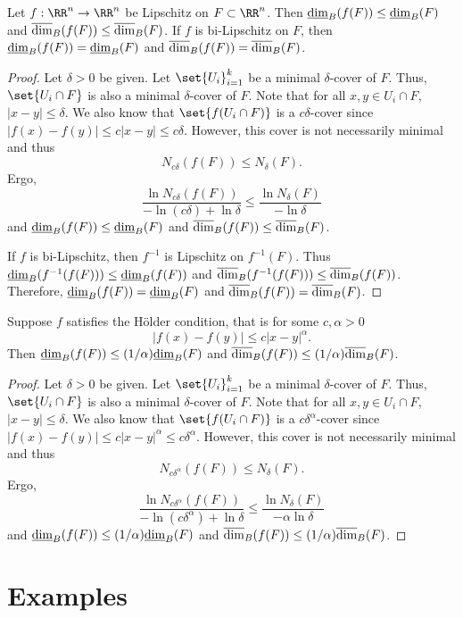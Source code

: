\begin{thm}
	Let $f:\RR^n\rightarrow\RR^n$ be Lipschitz on $F\subset\RR^n$.
	Then $\underline{\operatorname{dim}}_B(f(F))\leq\underline{\operatorname{dim}}_B(F)$ and $\overline{\operatorname{dim}}_B(f(F))\leq\overline{\operatorname{dim}}_B(F)$.
	If $f$ is bi-Lipschitz on $F$, then $\underline{\operatorname{dim}}_B(f(F))=\underline{\operatorname{dim}}_B(F)$ and $\overline{\operatorname{dim}}_B(f(F))=\overline{\operatorname{dim}}_B(F)$.
\end{thm}
\begin{proof}
	Let $\delta > 0$ be given.
	Let $\set{U_i}_{i=1}^k$ be a minimal $\delta$-cover of $F$.
	Thus, $\set{U_i\cap F}$ is also a minimal $\delta$-cover of $F$.
	Note that for all $x,y\in U_i\cap F$, $|x-y|\leq \delta$.
	We also know that $\set{f(U_i\cap F)}$ is a $c\delta$-cover since $|f(x)-f(y)|\leq c|x-y|\leq c\delta$.
	However, this cover is not necessarily minimal and thus
	\[
		N_{c\delta}(f(F))\leq N_\delta(F).
	\]
	Ergo,
	\[
		\frac{\ln N_{c\delta}(f(F))}{-\ln(c\delta)+\ln\delta}\leq\frac{\ln N_\delta(F)}{-\ln\delta}
	\]
	and $\underline{\operatorname{dim}}_B(f(F))\leq\underline{\operatorname{dim}}_B(F)$ and $\overline{\operatorname{dim}}_B(f(F))\leq\overline{\operatorname{dim}}_B(F)$.

	If $f$ is bi-Lipschitz, then $f^{-1}$ is Lipschitz on $f^{-1}(F)$.
	Thus $\underline{\operatorname{dim}}_B(f^{-1}(f(F)))\leq\underline{\operatorname{dim}}_B(f(F))$ and $\overline{\operatorname{dim}}_B(f^{-1}(f(F)))\leq\overline{\operatorname{dim}}_B(f(F))$.
	Therefore, $\underline{\operatorname{dim}}_B(f(F))=\underline{\operatorname{dim}}_B(F)$ and $\overline{\operatorname{dim}}_B(f(F))=\overline{\operatorname{dim}}_B(F)$.
\end{proof}

\begin{thm}
	Suppose $f$ satisfies the H\"{o}lder condition, that is for some $c,\alpha>0$
	\[
		|f(x)-f(y)|\leq c|x-y|^\alpha.
	\]
	Then $\underline{\operatorname{dim}}_B(f(F))\leq(1/\alpha)\underline{\operatorname{dim}}_B(F)$ and $\overline{\operatorname{dim}}_B(f(F))\leq(1/\alpha)\overline{\operatorname{dim}}_B(F)$.
\end{thm}
\begin{proof}
	Let $\delta > 0$ be given.
	Let $\set{U_i}_{i=1}^k$ be a minimal $\delta$-cover of $F$.
	Thus, $\set{U_i\cap F}$ is also a minimal $\delta$-cover of $F$.
	Note that for all $x,y\in U_i\cap F$, $|x-y|\leq \delta$.
	We also know that $\set{f(U_i\cap F)}$ is a $c\delta^\alpha$-cover since $|f(x)-f(y)|\leq c|x-y|^\alpha\leq c\delta^\alpha$.
	However, this cover is not necessarily minimal and thus
	\[
		N_{c\delta^\alpha}(f(F))\leq N_\delta(F).
	\]
	Ergo,
	\[
		\frac{\ln N_{c\delta^\alpha}(f(F))}{-\ln(c\delta^\alpha)+\ln\delta}\leq\frac{\ln N_\delta(F)}{-\alpha\ln\delta}
	\]
	and $\underline{\operatorname{dim}}_B(f(F))\leq(1/\alpha)\underline{\operatorname{dim}}_B(F)$ and $\overline{\operatorname{dim}}_B(f(F))\leq(1/\alpha)\overline{\operatorname{dim}}_B(F)$.
\end{proof}

\section{Examples}

